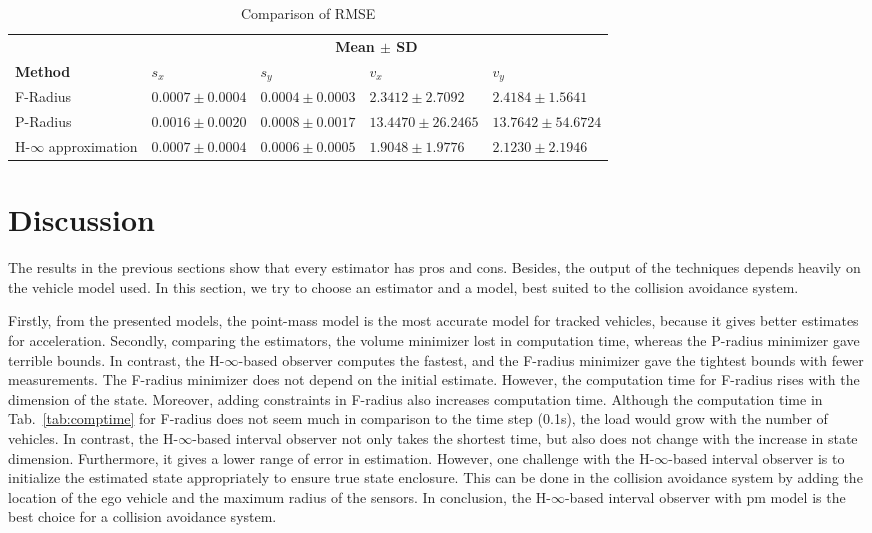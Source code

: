 \begin{table}[!h]
\caption{Comparison of RMSE}
	\centering
	\renewcommand{\arraystretch}{1.1}
	\small	
	\begin{tabular}{l l l l l}
		\toprule 
		& \multicolumn{4}{c}{\textbf{Mean $\pm$ SD}} \\ \cmidrule{2-5}
		\textbf{Method} & \textbf{$s_x$} & \textbf{$s_y$} & \textbf{$v_x$} & \textbf{$v_y$}\\ \midrule
		F-Radius & $0.0007\pm 0.0004$ &  $0.0004  \pm 0.0003$ &  $2.3412 \pm 2.7092$ &   $2.4184 \pm 1.5641$ \\
		P-Radius & $0.0016 \pm 0.0020$ &   $0.0008 \pm 0.0017$  & $13.4470 \pm 26.2465$ &  $13.7642 \pm 54.6724$\\
		H-$\infty$ approximation & $0.0007 \pm 0.0004$ &  $0.0006 \pm 0.0005$   & $1.9048 \pm  1.9776$  &  $ 2.1230 \pm  2.1946$\\
		\bottomrule
	\end{tabular}
	\label{tab:errormean}
\end{table}

\section{Discussion}
The results in the previous sections show that every estimator has pros and cons. Besides, the output of the techniques depends heavily on the vehicle model used. In this section, we try to choose an estimator and a model, best suited to the collision avoidance system. 

Firstly, from the presented models, the point-mass model is the most accurate model for tracked vehicles, because it gives better estimates for acceleration. Secondly, comparing the estimators, the volume minimizer lost in computation time, whereas the P-radius minimizer gave terrible bounds. In contrast, the H-$\infty$-based observer computes the fastest, and the F-radius minimizer gave the tightest bounds with fewer measurements. The F-radius minimizer does not depend on the initial estimate. However, the computation time for F-radius rises with the dimension of the state. Moreover, adding constraints in F-radius also increases computation time. Although the computation time in Tab.~\ref{tab:comptime} for F-radius does not seem much in comparison to the time step (0.1s), the load would grow with the number of vehicles. In contrast, the H-$\infty$-based interval observer not only takes the shortest time, but also does not change with the increase in state dimension. Furthermore, it gives a lower range of error in estimation. However, one challenge with the H-$\infty$-based interval observer is to initialize the estimated state appropriately to ensure true state enclosure. This can be done in the collision avoidance system by adding the location of the ego vehicle and the maximum radius of the sensors. In conclusion, the H-$\infty$-based interval observer with pm model is the best choice for a collision avoidance system. 

